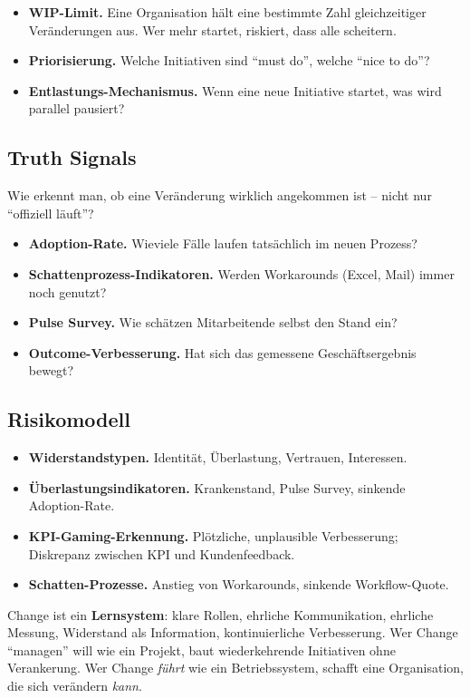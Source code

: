 \documentclass[11pt,a4paper,oneside]{article}
\begin{document}
\begin{itemize}
  \item \textbf{WIP-Limit.} Eine Organisation hält eine bestimmte Zahl gleichzeitiger Veränderungen aus. Wer mehr startet, riskiert, dass alle scheitern.
  \item \textbf{Priorisierung.} Welche Initiativen sind ``must do'', welche ``nice to do''?
  \item \textbf{Entlastungs-Mechanismus.} Wenn eine neue Initiative startet, was wird parallel pausiert?
\end{itemize}

\subsection{Truth Signals}

Wie erkennt man, ob eine Veränderung wirklich angekommen ist -- nicht nur ``offiziell läuft''?

\begin{itemize}
  \item \textbf{Adoption-Rate.} Wieviele Fälle laufen tatsächlich im neuen Prozess?
  \item \textbf{Schattenprozess-Indikatoren.} Werden Workarounds (Excel, Mail) immer noch genutzt?
  \item \textbf{Pulse Survey.} Wie schätzen Mitarbeitende selbst den Stand ein?
  \item \textbf{Outcome-Verbesserung.} Hat sich das gemessene Geschäftsergebnis bewegt?
\end{itemize}

\subsection{Risikomodell}

\begin{itemize}
  \item \textbf{Widerstandstypen.} Identität, Überlastung, Vertrauen, Interessen.
  \item \textbf{Überlastungsindikatoren.} Krankenstand, Pulse Survey, sinkende Adoption-Rate.
  \item \textbf{KPI-Gaming-Erkennung.} Plötzliche, unplausible Verbesserung; Diskrepanz zwischen KPI und Kundenfeedback.
  \item \textbf{Schatten-Prozesse.} Anstieg von Workarounds, sinkende Workflow-Quote.
\end{itemize}

\begin{merkbox}
Change ist ein \textbf{Lernsystem}: klare Rollen, ehrliche Kommunikation, ehrliche Messung, Widerstand als Information, kontinuierliche Verbesserung. Wer Change ``managen'' will wie ein Projekt, baut wiederkehrende Initiativen ohne Verankerung. Wer Change \emph{führt} wie ein Betriebssystem, schafft eine Organisation, die sich verändern \emph{kann}.
\end{merkbox}
\end{document}
